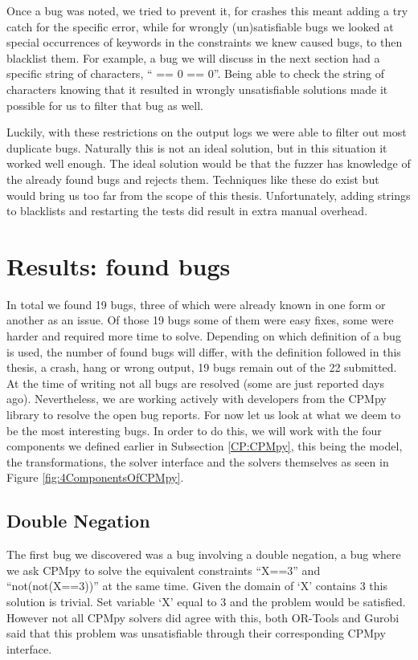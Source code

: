 Once a bug was noted, we tried to prevent it, for crashes this meant adding a try catch for the specific error, while for wrongly (un)satisfiable bugs we looked at special occurrences of keywords in the constraints we knew caused bugs, to then blacklist them. For example, a bug we will discuss in the next section had a specific string of characters, “ == 0 == 0”. Being able to check the string of characters knowing that it resulted in wrongly unsatisfiable solutions made it possible for us to filter that bug as well. 

Luckily, with these restrictions on the output logs we were able to filter out most duplicate bugs. Naturally this is not an ideal solution, but in this situation it worked well enough. The ideal solution would be that the fuzzer has knowledge of the already found bugs and rejects them. Techniques like these do exist but would bring us too far from the scope of this thesis. Unfortunately, adding strings to blacklists and restarting the tests did result in extra manual overhead.

\section{Results: found bugs}
\label{res:bugs}
In total we found 19 bugs, three of which were already known in one form or another as an issue. Of those 19 bugs some of them were easy fixes, some were harder and required more time to solve. Depending on which definition of a bug is used, the number of found bugs will differ, with the definition followed in this thesis, a crash, hang or wrong output, 19 bugs remain out of the 22 submitted. At the time of writing not all bugs are resolved (some are just reported days ago). Nevertheless, we are working actively with developers from the CPMpy library to resolve the open bug reports. For now let us look at what we deem to be the most interesting bugs. In order to do this, we will work with the four components we defined earlier in Subsection \ref{CP:CPMpy}, this being the model, the transformations, the solver interface and the solvers themselves as seen in Figure \ref{fig:4ComponentsOfCPMpy}.


\subsection{Double Negation}
\label{res:bug:DoubleNot}
The first bug we discovered was a bug involving a double negation, a bug where we ask CPMpy to solve the equivalent constraints “X==3” and “not(not(X==3))” at the same time. Given the domain of ‘X’ contains 3 this solution is trivial. Set variable ‘X’ equal to 3 and the problem would be satisfied. However not all CPMpy solvers did agree with this, both OR-Tools and Gurobi said that this problem was unsatisfiable through their corresponding CPMpy interface.

